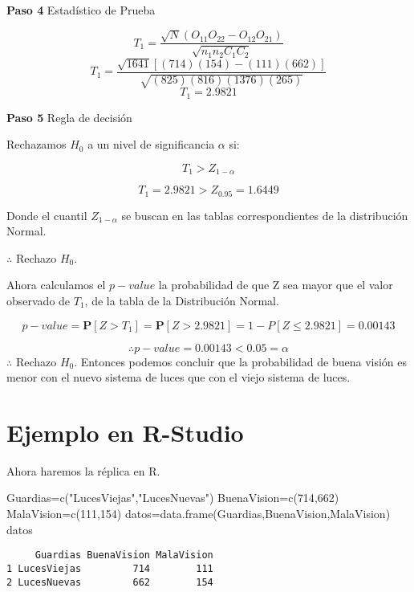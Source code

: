 \documentclass[
  a4paper,
  oneside,
  openany]{book}
\newenvironment{Shaded}{\begin{snugshade}}{\end{snugshade}}
\newcommand{\DecValTok}[1]{\textcolor[rgb]{0.00,0.00,0.81}{#1}}
\newcommand{\FunctionTok}[1]{\textcolor[rgb]{0.00,0.00,0.00}{#1}}
\newcommand{\NormalTok}[1]{#1}
\newcommand{\OtherTok}[1]{\textcolor[rgb]{0.56,0.35,0.01}{#1}}
\newcommand{\StringTok}[1]{\textcolor[rgb]{0.31,0.60,0.02}{#1}}
\begin{document}
\textbf{Paso 4} Estadístico de Prueba

\[T_{1}=\frac{\sqrt{N}(O_{11}O_{22}-O_{12}O_{21})}{\sqrt{n_{1}n_{2}C_{1}C_{2}}}\]
\[T_{1}=\frac{\sqrt{1641}[(714)(154)-(111)(662)]}{\sqrt{(825)(816)(1376)(265)}}\]
\[T_{1}= 2.9821\]

\textbf{Paso 5} Regla de decisión

Rechazamos \(H_0\) a un nivel de significancia \(\alpha\) si:

\[T_{1} > Z_{1-\alpha}\]

\[T_{1}=2.9821 > Z_{0.95}= 1.6449\]

Donde el cuantil \(Z_{1-\alpha}\) se buscan en las tablas correspondientes de la distribución Normal.

\(\therefore\) Rechazo \(H_0\).

Ahora calculamos el \(p-value\) la probabilidad de que Z sea mayor que el valor observado de \(T_{1}\), de la tabla de la Distribución Normal.

\[p-value=\mathbf{P}[Z>T_{1}]=\mathbf{P}[Z>2.9821]=1-P[Z\leq2.9821]=0.00143\]

\[\therefore p-value=0.00143 < 0.05=\alpha\]
\(\therefore\) Rechazo \(H_0\). Entonces podemos concluir que la probabilidad de buena visión es menor con el nuevo sistema de luces que con el viejo sistema de luces.

\hypertarget{ejemplo-en-r-studio-9}{%
\section{Ejemplo en R-Studio}\label{ejemplo-en-r-studio-9}}

Ahora haremos la réplica en R.

\begin{Shaded}
\begin{Highlighting}[]
\NormalTok{Guardias}\OtherTok{=}\FunctionTok{c}\NormalTok{(}\StringTok{"LucesViejas"}\NormalTok{,}\StringTok{"LucesNuevas"}\NormalTok{)}
\NormalTok{BuenaVision}\OtherTok{=}\FunctionTok{c}\NormalTok{(}\DecValTok{714}\NormalTok{,}\DecValTok{662}\NormalTok{)}
\NormalTok{MalaVision}\OtherTok{=}\FunctionTok{c}\NormalTok{(}\DecValTok{111}\NormalTok{,}\DecValTok{154}\NormalTok{)}
\NormalTok{datos}\OtherTok{=}\FunctionTok{data.frame}\NormalTok{(Guardias,BuenaVision,MalaVision)}
\NormalTok{datos}
\end{Highlighting}
\end{Shaded}

\begin{verbatim}
     Guardias BuenaVision MalaVision
1 LucesViejas         714        111
2 LucesNuevas         662        154
\end{verbatim}
\end{document}
